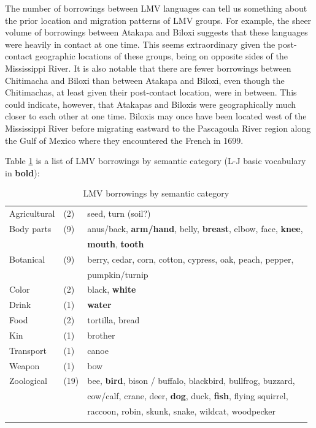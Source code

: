 \documentclass[output=paper]{LSP/langsci}
\begin{document}
	The number of borrowings between LMV languages can tell us something about the prior location and migration patterns of LMV groups. For example, the sheer volume of borrowings between Atakapa and Biloxi suggests that these languages were heavily in contact at one time. This seems extraordinary given the post-contact geographic locations of these groups, being on opposite sides of the Mississippi River. It is also notable that there are fewer borrowings between Chitimacha and Biloxi than between Atakapa and Biloxi, even though the Chitimachas, at least given their post-contact location, were in between. This could indicate, however, that Atakapas and Biloxis were geographically much closer to each other at one time. Biloxis may once have been located west of the Mississippi River before migrating eastward to the Pascagoula River region along the Gulf of Mexico where they encountered the French in 1699.

	Table \ref{LMVloans} is a list of LMV borrowings by semantic category (L-J basic vocabulary in \textbf{bold}): 

\begin{table}
\caption{LMV borrowings by semantic category} \label{LMVloans}
\begin{tabular} [h]{lll}
\lsptoprule
Agricultural & (2) & seed, turn (soil?) \\
Body parts & (9) & anus/back, \textbf{arm/hand}, belly, \textbf{breast}, elbow, face, \textbf{knee}, \\
&  & \textbf{mouth}, \textbf{tooth}  \\
Botanical & (9) & berry, cedar, corn, cotton, cypress, oak, peach, pepper, \\
& & pumpkin/turnip \\
Color & (2) & black, \textbf{white} \\
Drink & (1) & \textbf{water} \\
Food & (2) & tortilla, bread \\
Kin & (1) & brother \\
Transport & (1) & canoe \\
Weapon & (1) & bow \\
Zoological & (19) & bee, \textbf{bird}, bison / buffalo, blackbird, bullfrog, buzzard,  \\
& & cow/calf, crane, deer, \textbf{dog}, duck, \textbf{fish}, flying squirrel, \\
&  & raccoon, robin, skunk, snake, wildcat, woodpecker \\
\lspbottomrule
\end{tabular}
\end{table}
\end{document}
